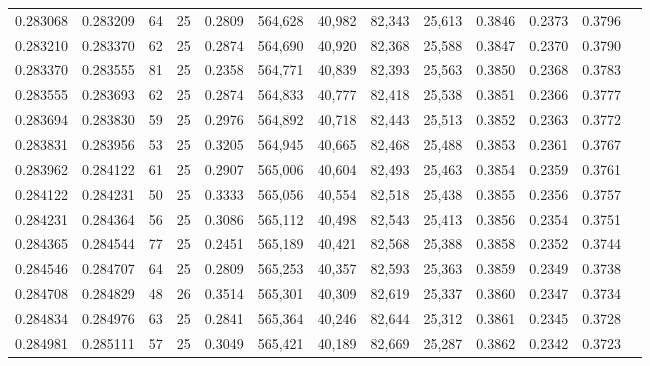 \begin{tabular}{rrrrrrrrrrrrr}
0.283068 & 0.283209 &    64 &  25 &                                     0.2809 & 564,628 &  40,982 &  82,343 &  25,613 & 0.3846 & 0.2373 & 0.3796 \\
0.283210 & 0.283370 &    62 &  25 &                                     0.2874 & 564,690 &  40,920 &  82,368 &  25,588 & 0.3847 & 0.2370 & 0.3790 \\
0.283370 & 0.283555 &    81 &  25 &                                     0.2358 & 564,771 &  40,839 &  82,393 &  25,563 & 0.3850 & 0.2368 & 0.3783 \\
0.283555 & 0.283693 &    62 &  25 &                                     0.2874 & 564,833 &  40,777 &  82,418 &  25,538 & 0.3851 & 0.2366 & 0.3777 \\
0.283694 & 0.283830 &    59 &  25 &                                     0.2976 & 564,892 &  40,718 &  82,443 &  25,513 & 0.3852 & 0.2363 & 0.3772 \\
0.283831 & 0.283956 &    53 &  25 &                                     0.3205 & 564,945 &  40,665 &  82,468 &  25,488 & 0.3853 & 0.2361 & 0.3767 \\
0.283962 & 0.284122 &    61 &  25 &                                     0.2907 & 565,006 &  40,604 &  82,493 &  25,463 & 0.3854 & 0.2359 & 0.3761 \\
0.284122 & 0.284231 &    50 &  25 &                                     0.3333 & 565,056 &  40,554 &  82,518 &  25,438 & 0.3855 & 0.2356 & 0.3757 \\
0.284231 & 0.284364 &    56 &  25 &                                     0.3086 & 565,112 &  40,498 &  82,543 &  25,413 & 0.3856 & 0.2354 & 0.3751 \\
0.284365 & 0.284544 &    77 &  25 &                                     0.2451 & 565,189 &  40,421 &  82,568 &  25,388 & 0.3858 & 0.2352 & 0.3744 \\
0.284546 & 0.284707 &    64 &  25 &                                     0.2809 & 565,253 &  40,357 &  82,593 &  25,363 & 0.3859 & 0.2349 & 0.3738 \\
0.284708 & 0.284829 &    48 &  26 &                                     0.3514 & 565,301 &  40,309 &  82,619 &  25,337 & 0.3860 & 0.2347 & 0.3734 \\
0.284834 & 0.284976 &    63 &  25 &                                     0.2841 & 565,364 &  40,246 &  82,644 &  25,312 & 0.3861 & 0.2345 & 0.3728 \\
0.284981 & 0.285111 &    57 &  25 &                                     0.3049 & 565,421 &  40,189 &  82,669 &  25,287 & 0.3862 & 0.2342 & 0.3723 \\

\end{tabular}
